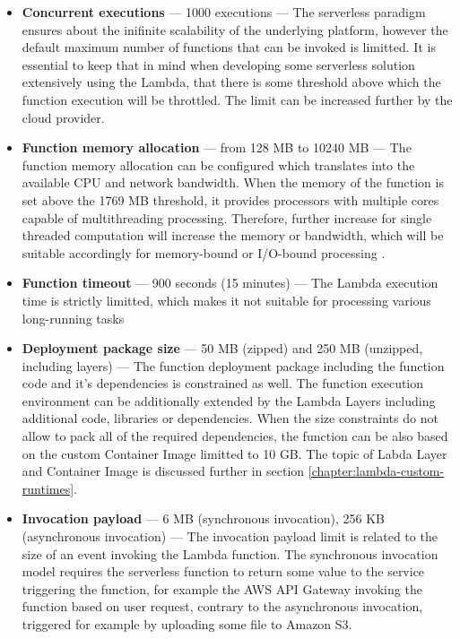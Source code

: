 \begin{itemize}
    \item \textbf{Concurrent executions} --- 1000 executions --- The serverless paradigm ensures about the inifinite scalability of the underlying platform, however the default maximum number of functions that can be invoked is limitted. It is essential to keep that in mind when developing some serverless solution extensively using the Lambda, that there is some threshold above which the function execution will be throttled. The limit can be increased further by the cloud provider.
    \item \textbf{Function memory allocation} --- from 128 MB to 10240 MB --- The function memory allocation can be configured which translates into the available CPU and network bandwidth. When the memory of the function is set above the 1769 MB threshold, it provides processors with multiple cores capable of multithreading processing. Therefore, further increase for single threaded computation will increase the memory or bandwidth, which will be suitable accordingly for memory-bound or I/O-bound processing \cite{BecomeAServerlessBlackBelt}. 
    \item \textbf{Function timeout} --- 900 seconds (15 minutes) --- The Lambda execution time is strictly limitted, which makes it not suitable for processing various long-running tasks
    \item \textbf{Deployment package size} --- 50 MB (zipped) and 250 MB (unzipped, including layers) --- The function deployment package including the function code and it's dependencies is constrained as well. The function execution environment can be additionally extended by the Lambda Layers including additional code, libraries or dependencies. When the size constraints do not allow to pack all of the required dependencies, the function can be also based on the custom Container Image limitted to 10 GB. The topic of Labda Layer and Container Image is discussed further in section \ref{chapter:lambda-custom-runtimes}.
    \item \textbf{Invocation payload} --- 6 MB (synchronous invocation), 256 KB (asynchronous invocation) --- The invocation payload limit is related to the size of an event invoking the Lambda function. 
    The synchronous invocation model requires the serverless function to return some value to the service triggering the function, for example the AWS API Gateway invoking the function based on user request, contrary to the asynchronous invocation, triggered for example by uploading some file to Amazon S3. 

\end{itemize}

